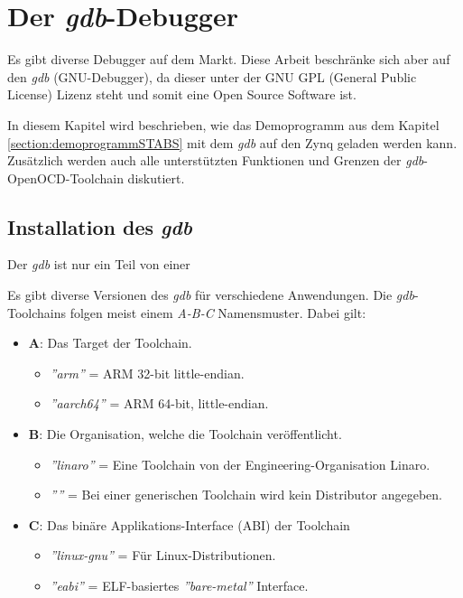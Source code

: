 \chapter{Der \textit{gdb}-Debugger}
Es gibt diverse Debugger auf dem Markt.
Diese Arbeit beschränke sich aber auf den  \textit{gdb} (GNU-Debugger), da dieser unter der GNU GPL (General Public License) Lizenz steht und somit eine Open Source Software ist.

In diesem Kapitel wird beschrieben, wie das Demoprogramm aus dem Kapitel \ref{section:demoprogrammSTABS} mit dem \textit{gdb} auf den Zynq geladen werden kann.
Zusätzlich werden auch alle unterstützten Funktionen und Grenzen der \textit{gdb}-OpenOCD-Toolchain diskutiert.


\section{Installation des \textit{gdb}}
Der \textit{gdb} ist nur ein Teil von einer

Es gibt diverse Versionen des \textit{gdb} für verschiedene Anwendungen.
Die \textit{gdb}-Toolchains folgen meist einem \textit{A-B-C} Namensmuster.
Dabei gilt:
\begin{itemize}
	\item \textbf{A}: Das Target der Toolchain.
	\begin{itemize}
		\item \textit{''arm''} = ARM 32-bit little-endian.
		\item \textit{''aarch64''} = ARM 64-bit, little-endian.
	\end{itemize}
	\item \textbf{B}: Die Organisation, welche die Toolchain veröffentlicht.
	\begin{itemize}
		\item \textit{''linaro''} = Eine Toolchain von der Engineering-Organisation Linaro.
		\item \textit{''''} = Bei einer generischen Toolchain wird kein Distributor angegeben.
	\end{itemize}
	\item \textbf{C}: Das binäre Applikations-Interface (ABI) der Toolchain
	\begin{itemize}
		\item \textit{''linux-gnu''} = Für Linux-Distributionen.
		\item \textit{''eabi''} = ELF-basiertes \textit{''bare-metal''} Interface.
	\end{itemize}
\end{itemize}

